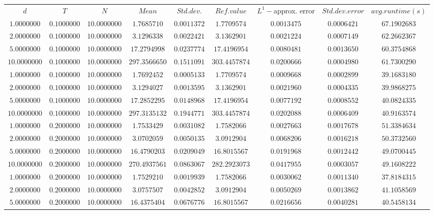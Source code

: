 \begin{tabular}{ccccccccc}
$d$ & $T$ & $N$ & $Mean$ & $Std. dev.$ & $Ref. value$ & $L^1-$approx. error & $Std. dev. error$ & $avg. runtime (s)$\\
$1.0000000$ & $0.1000000$ & $10.0000000$ & $1.7685710$ & $0.0011372$ & $1.7709574$ & $0.0013475$ & $0.0006421$ & $67.1902683$\\
$2.0000000$ & $0.1000000$ & $10.0000000$ & $3.1296338$ & $0.0022421$ & $3.1362901$ & $0.0021224$ & $0.0007149$ & $62.2662367$\\
$5.0000000$ & $0.1000000$ & $10.0000000$ & $17.2794998$ & $0.0237774$ & $17.4196954$ & $0.0080481$ & $0.0013650$ & $60.3754868$\\
$10.0000000$ & $0.1000000$ & $10.0000000$ & $297.3566650$ & $0.1511091$ & $303.4457874$ & $0.0200666$ & $0.0004980$ & $61.7300290$\\
$1.0000000$ & $0.1000000$ & $10.0000000$ & $1.7692452$ & $0.0005133$ & $1.7709574$ & $0.0009668$ & $0.0002899$ & $39.1683180$\\
$2.0000000$ & $0.1000000$ & $10.0000000$ & $3.1294027$ & $0.0013595$ & $3.1362901$ & $0.0021960$ & $0.0004335$ & $39.9868275$\\
$5.0000000$ & $0.1000000$ & $10.0000000$ & $17.2852295$ & $0.0148968$ & $17.4196954$ & $0.0077192$ & $0.0008552$ & $40.0824335$\\
$10.0000000$ & $0.1000000$ & $10.0000000$ & $297.3135132$ & $0.1944771$ & $303.4457874$ & $0.0202088$ & $0.0006409$ & $40.9163574$\\
$1.0000000$ & $0.2000000$ & $10.0000000$ & $1.7533429$ & $0.0031082$ & $1.7582066$ & $0.0027663$ & $0.0017678$ & $51.3384634$\\
$2.0000000$ & $0.2000000$ & $10.0000000$ & $3.0702059$ & $0.0050135$ & $3.0912904$ & $0.0068206$ & $0.0016218$ & $50.3732560$\\
$5.0000000$ & $0.2000000$ & $10.0000000$ & $16.4790203$ & $0.0209049$ & $16.8015567$ & $0.0191968$ & $0.0012442$ & $49.0700445$\\
$10.0000000$ & $0.2000000$ & $10.0000000$ & $270.4937561$ & $0.0863067$ & $282.2923073$ & $0.0417955$ & $0.0003057$ & $49.1608222$\\
$1.0000000$ & $0.2000000$ & $10.0000000$ & $1.7529210$ & $0.0019939$ & $1.7582066$ & $0.0030062$ & $0.0011340$ & $37.8184315$\\
$2.0000000$ & $0.2000000$ & $10.0000000$ & $3.0757507$ & $0.0042852$ & $3.0912904$ & $0.0050269$ & $0.0013862$ & $41.1058569$\\
$5.0000000$ & $0.2000000$ & $10.0000000$ & $16.4375404$ & $0.0676776$ & $16.8015567$ & $0.0216656$ & $0.0040281$ & $40.5458134$\\

\end{tabular}
